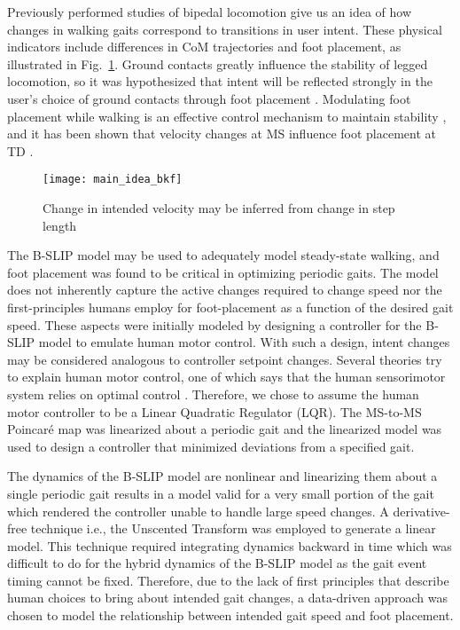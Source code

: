 Previously performed studies of bipedal locomotion give us an idea of how changes in walking gaits correspond to transitions in user intent. These physical indicators include differences in CoM trajectories and foot placement, as illustrated in Fig.~\ref{fig:main_idea}. Ground contacts greatly influence the stability of legged locomotion, so it was hypothesized that intent will be reflected strongly in the user's choice of ground contacts through foot placement \cite{bhounsule2014foot}. Modulating foot placement while walking is an effective control mechanism to maintain stability \cite{hof2010balance,bhounsule2015control}, and it has been shown that velocity changes at MS influence foot placement at TD \cite{wang2014stepping,redfern1994model}. 

\begin{figure}
	\centering
	\texttt{[image: main\_idea\_bkf]}
	\caption{Change in intended velocity may be inferred from change in step length}\label{fig:main_idea}
\end{figure}

The B-SLIP model may be used to adequately model steady-state walking, and foot placement was found to be critical in optimizing periodic gaits. The model does not inherently capture the active changes required to change speed nor the first-principles humans employ for foot-placement as a function of the desired gait speed. These aspects were initially modeled by designing a controller for the B-SLIP model to emulate human motor control. With such a design, intent changes may be considered analogous to controller setpoint changes. Several theories try to explain human motor control, one of which says that the human sensorimotor system relies on optimal control \cite{todorov2004optimality,sylla2014assessing}. Therefore, we chose to assume the human motor controller to be a Linear Quadratic Regulator (LQR). The MS-to-MS Poincar\'e map was linearized about a periodic gait and the linearized model was used to design a controller that minimized deviations from a specified gait. 

The dynamics of the B-SLIP model are nonlinear and linearizing them about a single periodic gait results in a model valid for a very small portion of the gait which rendered the controller unable to handle large speed changes. A derivative-free technique i.e., the Unscented Transform \cite{manchester2016derivative} was employed to generate a linear model. This technique required integrating dynamics backward in time which was difficult to do for the hybrid dynamics of the B-SLIP model as the gait event timing cannot be fixed. Therefore, due to the lack of first principles that describe human choices to bring about intended gait changes, a data-driven approach was chosen to model the relationship between intended gait speed and foot placement.


